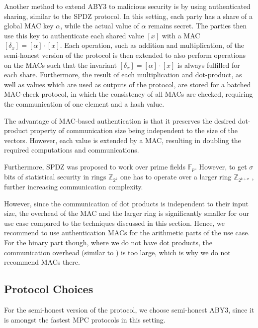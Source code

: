 \documentclass[a4paper,11pt,
]{article}
\newcommand{\F}{\ensuremath{\mathbb{F}}\xspace}
\newcommand{\Z}{\ensuremath{\mathbb{Z}}\xspace}
\newcommand{\shared}[1]{\ensuremath{[{#1}]}}
\begin{document}
Another method to extend ABY3 to malicious security is by using authenticated sharing, similar to the SPDZ \cite{DBLP:conf/crypto/DamgardPSZ12} protocol. In this setting, each party has a share of a global MAC key $\alpha$, while the actual value of $\alpha$ remains secret. The parties then use this key to authenticate each shared value $\shared{x}$ with a MAC $\shared{\delta_x} = \shared{\alpha} \cdot \shared{x}$. Each operation, such as addition and multiplication, of the semi-honest version of the protocol is then extended to also perform operations on the MACs such that the invariant $\shared{\delta_x} = \shared{\alpha} \cdot \shared{x}$ is always fulfilled for each share. Furthermore, the result of each multiplication and dot-product, as well as values which are used as outputs of the protocol, are stored for a batched MAC-check protocol, in which the consistency of all MACs are checked, requiring the communication of one element and a hash value.

The advantage of MAC-based authentication is that it preserves the desired dot-product property of communication size being independent to the size of the vectors. However, each value is extended by a MAC, resulting in doubling the required computations and communications.

Furthermore, SPDZ was proposed to work over prime fields $\F_p$. However, to get $\sigma$ bits of statistical security in rings $\Z_{2^k}$ one has to operate over a larger ring $\Z_{2^{k+\sigma}}$ \cite{DBLP:conf/acns/AbspoelD0N21, DBLP:conf/uss/Dalskov0K21}, further increasing communication complexity.

However, since the communication of dot products is independent to their input size, the overhead of the MAC and the larger ring is significantly smaller for our use case compared to the techniques discussed in this section. Hence, we recommend to use authentication MACs for the arithmetic parts of the use case. For the binary part though, where we do not have dot products, the communication overhead (similar to ) is too large, which is why we do not recommend MACs there.

\subsection{Protocol Choices} \label{sec::choice}

For the semi-honest version of the protocol, we choose semi-honest ABY3, since it is amongst the fastest MPC protocols in this setting.
\end{document}

